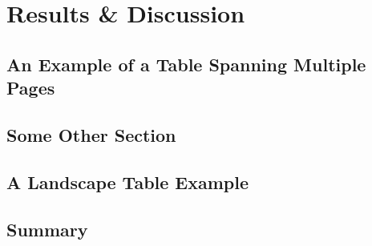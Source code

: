 \chapter{Results \& Discussion}

\section{An Example of a Table Spanning Multiple Pages}

\section{Some Other Section}

\section{A Landscape Table Example}

\section{Summary}
